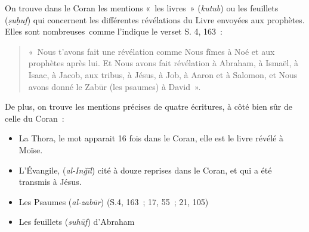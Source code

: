 {

\label{quels-livres-ruxe9vuxe9luxe9s}}

On trouve dans le Coran les mentions «~les livres~» (\emph{kutub}) ou
les feuillets (\emph{ṣuḥuf}) qui concernent les différentes révélations
du Livre envoyées aux prophètes. Elles sont nombreuses~comme l'indique
le verset S. 4, 163~:

\begin{quote}
«~Nous t'avons fait une révélation comme Nous fîmes à Noé et aux
prophètes après lui. Et Nous avons fait révélation à Abraham, à Ismaël,
à Isaac, à Jacob, aux tribus, à Jésus, à Job, à Aaron et à Salomon, et
Nous avons donné le Zabūr (les psaumes) à David~».

\end{quote}

De plus, on trouve les mentions précises de quatre écritures, à côté
bien sûr de celle du Coran~:

\begin{itemize}
\item
  La Thora, le mot apparait 16 fois dans le Coran, elle est le livre
  révélé à Moïse.
\item
  L'Évangile, (\emph{al-Inǧīl}) cité à douze reprises dans le Coran, et
  qui a été transmis à Jésus.
\item
  Les Psaumes (\emph{al-zabūr}) (S.4, 163~; 17, 55~; 21, 105)
\item
  Les feuillets (\emph{suhūf}) d'Abraham
\end{itemize}


